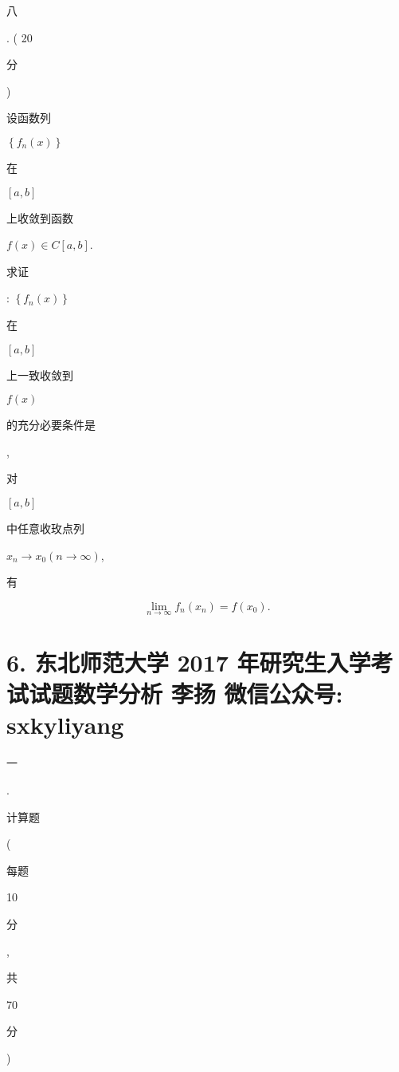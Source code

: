 \documentclass[10pt]{article}
\begin{document}
\begin{CJK}{UTF8}{mj}八\end{CJK}. ( 20 \begin{CJK}{UTF8}{mj}分\end{CJK}) \begin{CJK}{UTF8}{mj}设函数列\end{CJK} $\left\{f_{n}(x)\right\}$ \begin{CJK}{UTF8}{mj}在\end{CJK} $[a, b]$ \begin{CJK}{UTF8}{mj}上收敛到函数\end{CJK} $f(x) \in C[a, b]$. \begin{CJK}{UTF8}{mj}求证\end{CJK}: $\left\{f_{n}(x)\right\}$ \begin{CJK}{UTF8}{mj}在\end{CJK} $[a, b]$ \begin{CJK}{UTF8}{mj}上一致收敛到\end{CJK} $f(x)$ \begin{CJK}{UTF8}{mj}的充分必要条件是\end{CJK}, \begin{CJK}{UTF8}{mj}对\end{CJK} $[a, b]$ \begin{CJK}{UTF8}{mj}中任意收玫点列\end{CJK} $x_{n} \rightarrow x_{0}(n \rightarrow \infty)$, \begin{CJK}{UTF8}{mj}有\end{CJK}
$$
\lim _{n \rightarrow \infty} f_{n}\left(x_{n}\right)=f\left(x_{0}\right) .
$$

\section{6. 东北师范大学 2017 年研究生入学考试试题数学分析 
 李扬 
 微信公众号: sxkyliyang}
\begin{CJK}{UTF8}{mj}一\end{CJK}. \begin{CJK}{UTF8}{mj}计算题\end{CJK} (\begin{CJK}{UTF8}{mj}每题\end{CJK} 10 \begin{CJK}{UTF8}{mj}分\end{CJK}, \begin{CJK}{UTF8}{mj}共\end{CJK} 70 \begin{CJK}{UTF8}{mj}分\end{CJK})
\end{document}
